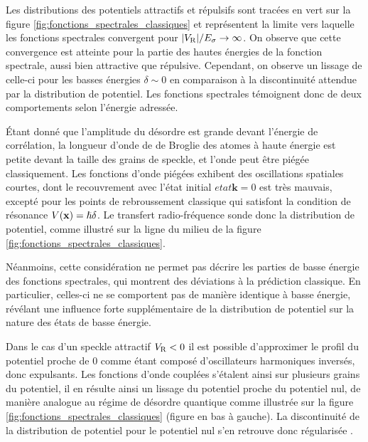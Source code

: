 Les distributions des potentiels attractifs et répulsifs sont tracées en vert sur la figure \ref{fig:fonctions_spectrales_classiques} et représentent la limite vers laquelle les fonctions spectrales convergent pour $|V_{\mathrm{R}}|/E_{\sigma}\rightarrow\infty$. On observe que cette convergence est atteinte pour la partie des hautes énergies de la fonction spectrale, aussi bien attractive que répulsive. Cependant, on observe un lissage de celle-ci pour les basses énergies $\delta\sim 0$ en comparaison à la discontinuité attendue par la distribution de potentiel. Les fonctions spectrales témoignent donc de deux comportements selon l'énergie adressée.

Étant donné que l'amplitude du désordre est grande devant l'énergie de corrélation, la longueur d'onde de de Broglie des atomes à haute énergie est petite devant la taille des grains de speckle, et l'onde peut être piégée classiquement. Les fonctions d'onde piégées exhibent des oscillations spatiales courtes, dont le recouvrement avec l'état initial $etat{\mathbf{k}=0}$ est très mauvais, excepté pour les points de rebroussement classique qui satisfont la condition de résonance $V(\mathbf{x})=\hslash\delta$. Le transfert radio-fréquence sonde donc la distribution de potentiel, comme illustré sur la ligne du milieu de la figure \ref{fig:fonctions_spectrales_classiques}.

Néanmoins, cette considération ne permet pas décrire les parties de basse énergie des fonctions spectrales, qui montrent des déviations à la prédiction classique. En particulier, celles-ci ne se comportent pas de manière identique à basse énergie, révélant une influence forte supplémentaire de la distribution de potentiel sur la nature des états de basse énergie.

Dans le cas d'un speckle attractif $V_{\mathrm{R}}<0$ il est possible d'approximer le profil du potentiel proche de 0 comme étant composé d'oscillateurs harmoniques inversés, donc expulsants. Les fonctions d'onde couplées s'étalent ainsi sur plusieurs grains du potentiel, il en résulte ainsi un lissage du potentiel proche du potentiel nul, de manière analogue au régime de désordre quantique comme illustrée sur la figure \ref{fig:fonctions_spectrales_classiques} (figure en bas à gauche). La discontinuité de la distribution de potentiel pour le potentiel nul s'en retrouve donc régularisée \citep{prat2016semiclassical}.

